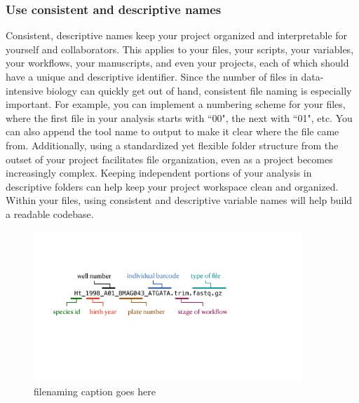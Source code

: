 \documentclass[10pt,letterpaper]{article}
\begin{document}
\subsubsection*{Use consistent and descriptive names}  
Consistent, descriptive names keep your project organized and interpretable for yourself and collaborators. 
This applies to your files, your scripts, your variables, your workflows, your manuscripts, and even your projects, each of which should have a unique and descriptive identifier. 
Since the number of files in data-intensive biology can quickly get out of hand, consistent file naming is especially important. 
For example, you can implement a numbering scheme for your files, where the first file in your analysis starts with ``00", the next with ``01", etc. 
You can also append the tool name to output to make it clear where the file came from. 
Additionally, using a standardized yet flexible folder structure from the outset of your project facilitates file organization, even as a project becomes increasingly complex. 
Keeping independent portions of your analysis in descriptive folders can help keep your project workspace clean and organized.
Within your files, using consistent and descriptive variable names will help build a readable codebase.

\begin{figure}
\includegraphics[width=0.9\textwidth]{figures/filenaming.pdf}
\caption{ filenaming caption goes here}
\label{fig:filenaming}
\end{figure}
\end{document}
